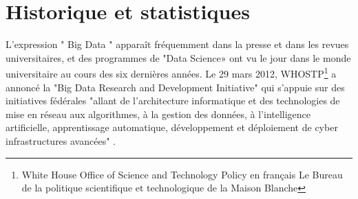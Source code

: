 \section{Historique et  statistiques}
\leftskip=1cm

L'expression " Big Data " apparaît fréquemment dans la presse et dans les revues universitaires, et des programmes de "Data Science» ont vu le jour dans le monde universitaire au cours des six dernières années. Le 29 mars 2012, WHOSTP\footnote{White House Office of Science and Technology Policy en français Le Bureau de la politique scientifique et technologique de la Maison Blanche} a annoncé la "Big Data Research and Development Initiative" qui s'appuie sur des initiatives fédérales "allant de l'architecture informatique et des technologies de mise en réseau aux algorithmes, à la gestion des données, à l'intelligence artificielle, apprentissage automatique, développement et déploiement de cyber infrastructures avancées"  \cite{ridgeway2018policing}.\\




